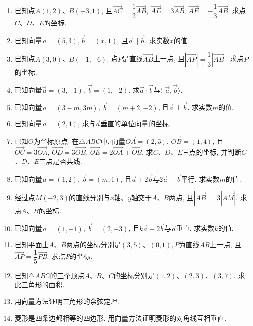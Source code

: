 \documentclass[10pt,a4paper]{article}
\begin{document}
\begin{enumerate}[1.]
\item 已知点$A(1, 2)$、$B(-3, 1)$, 且$\overrightarrow{AC}=\dfrac 12\overrightarrow{AB}$, $\overrightarrow{AD}=3\overrightarrow{AB}$, $\overrightarrow{AE}=-\dfrac 13\overrightarrow{AB}$. 求点$C$、$D$、$E$的坐标.
\item 已知向量$\overrightarrow a=(5, 3), \overrightarrow b=(x, 1)$, 且$\overrightarrow a\parallel \overrightarrow b$. 求实数$x$的值.
\item 已知点$A(3, 0)$、$B(-1, -6)$, 点$P$是直线$\overrightarrow{AB}$上一点, 且$|\overrightarrow{AP}|=\dfrac 13|\overrightarrow{AB}|$. 求点$P$的坐标.
\item 已知向量$\overrightarrow a=(3, -1)$, $\overrightarrow b=(1, -2)$. 求$\overrightarrow a\cdot \overrightarrow b$与$\langle$ $\overrightarrow a, \overrightarrow b\rangle$.
\item 已知向量$\overrightarrow a=(3-m, 3m)$, $\overrightarrow b=(m+2, -2)$, 且$\overrightarrow a\perp \overrightarrow b$. 求实数$m$的值.
\item 已知向量$\overrightarrow a=(2, 4)$, 求与$\overrightarrow a$垂直的单位向量的坐标.
\item 已知$O$为坐标原点, 在$\triangle ABC$中, 向量$\overrightarrow{OA}=(2, 3)$, $\overrightarrow{OB}=(1, 4)$, 且$\overrightarrow{OC}=3\overrightarrow{OA}$, $\overrightarrow{OD}=3\overrightarrow{OB}$, $\overrightarrow{OE}=2\overrightarrow{OA}+\overrightarrow{OB}$. 求$C$、$D$、$E$三点的坐标, 并判断$C$、$D$、$E$三点是否共线.
\item 已知向量$\overrightarrow a=(1, 2)$, $\overrightarrow b=(m, 1)$, 且$\overrightarrow a+2\overrightarrow b$与$2\overrightarrow a-\overrightarrow b$平行. 求实数$m$的值.
\item 经过点$M(-2, 3)$的直线分别与$x$轴、$y$轴交于$A$、$B$两点, 且$|\overrightarrow{AB}|=3|\overrightarrow{AM}|$. 求点$A$、$B$的坐标.
\item 已知向量$\overrightarrow a=(1, -1)$, $\overrightarrow b=(2, -3)$, 且$k\overrightarrow a-2\overrightarrow b$与$\overrightarrow a$垂直. 求实数$k$的值. 
\item 已知平面上$A$、$B$两点的坐标分别是$(3, 5)$、$(0, 1), P$为直线$AB$上一点, 且$\overrightarrow{AP}=\dfrac 15\overrightarrow{PB}$. 求点$P$的坐标.
\item 已知$\triangle ABC$的三个顶点$A$、$B$、$C$的坐标分别是$(1, 2)$、$(2, 3)$、$(3, 7)$, 求此三角形的面积.
\item 用向量方法证明三角形的余弦定理.
\item 菱形是四条边都相等的四边形. 用向量方法证明菱形的对角线互相垂直.

\end{enumerate}
\end{document}
